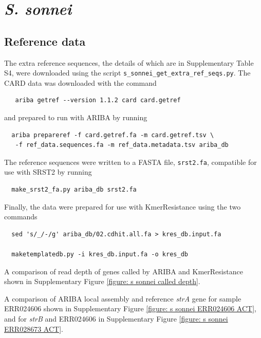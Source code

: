 \documentclass[11pt, a4paper]{article}
\begin{document}
\clearpage

\section{\emph{S. sonnei}}

\subsection{Reference data}
The extra reference sequences, the details of which are in
Supplementary Table S4,  were downloaded using the script
\verb+s_sonnei_get_extra_ref_seqs.py+. The CARD data was downloaded
with the command
\begin{verbatim}
   ariba getref --version 1.1.2 card card.getref
\end{verbatim}
and prepared to run with ARIBA by running
\begin{verbatim}
  ariba prepareref -f card.getref.fa -m card.getref.tsv \
   -f ref_data.sequences.fa -m ref_data.metadata.tsv ariba_db
\end{verbatim}
The reference sequences were written to a FASTA file,
\verb+srst2.fa+, compatible
for use with SRST2 by running
\begin{verbatim}
  make_srst2_fa.py ariba_db srst2.fa
\end{verbatim}
Finally, the data were prepared for use with KmerResistance using
the two commands
\begin{verbatim}
  sed 's/_/-/g' ariba_db/02.cdhit.all.fa > kres_db.input.fa

  maketemplatedb.py -i kres_db.input.fa -o kres_db
\end{verbatim}


A comparison of read depth of genes called by ARIBA and KmerResistance
shown in Supplementary Figure \ref{figure: s sonnei called depth}.

A comparison of ARIBA local assembly and reference \emph{strA} gene for sample
ERR024606 shown in Supplementary Figure \ref{figure: s sonnei ERR024606 ACT}, and for
\emph{strB} and ERR024606 in Supplementary Figure \ref{figure: s sonnei ERR028673 ACT}.
\end{document}
